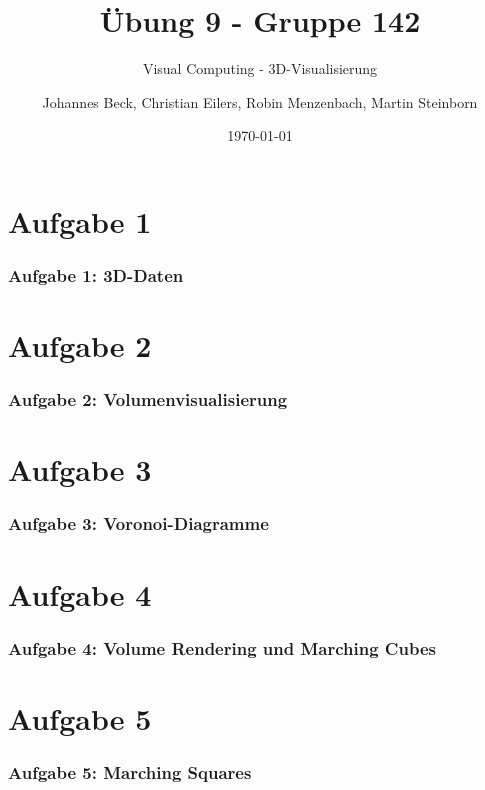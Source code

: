 \documentclass[accentcolor=tud9c,colorbacktitle,inverttitle,landscape,german,presentation,t]{tudbeamer}
\begin{document}
\title{\"Ubung 9 - Gruppe 142}
\subtitle{Visual Computing - 3D-Visualisierung}

\author[Johannes Beck, Christian Eilers, Robin Menzenbach, Martin Steinborn]{Johannes Beck, Christian Eilers, Robin Menzenbach, Martin Steinborn}


\date{\today}

\begin{titleframe}
\end{titleframe}

\section{Aufgabe 1}
	\begin{frame}
		\frametitle{Aufgabe 1: 3D-Daten}
	\end{frame}

\section{Aufgabe 2}
\begin{frame}
	\frametitle{Aufgabe 2: Volumenvisualisierung}
\end{frame}

\section{Aufgabe 3}
\begin{frame}
	\frametitle{Aufgabe 3: Voronoi-Diagramme}
\end{frame}

\section{Aufgabe 4}
\begin{frame}
	\frametitle{Aufgabe 4: Volume Rendering und Marching Cubes}
\end{frame}

\section{Aufgabe 5}
\begin{frame}
	\frametitle{Aufgabe 5: Marching Squares}
\end{frame}
\end{document}
